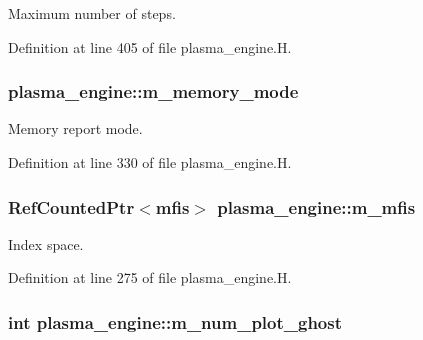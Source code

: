 Maximum number of steps. 



Definition at line 405 of file plasma\+\_\+engine.\+H.

\subsubsection[{\texorpdfstring{m\+\_\+memory\+\_\+mode}{m_memory_mode}}]{ plasma\+\_\+engine\+::m\+\_\+memory\+\_\+mode\hspace{0.3cm}{\ttfamily [protected]}}\hypertarget{classplasma__engine_aa19df07c387c3eb81c8ed8c00735389c}{}\label{classplasma__engine_aa19df07c387c3eb81c8ed8c00735389c}


Memory report mode. 



Definition at line 330 of file plasma\+\_\+engine.\+H.

\subsubsection[{\texorpdfstring{m\+\_\+mfis}{m_mfis}}]{\setlength{\rightskip}{0pt plus 5cm}Ref\+Counted\+Ptr$<${\bf mfis}$>$ plasma\+\_\+engine\+::m\+\_\+mfis\hspace{0.3cm}{\ttfamily [protected]}}\hypertarget{classplasma__engine_a585df123a78ab10b23c68209f2d36e7d}{}\label{classplasma__engine_a585df123a78ab10b23c68209f2d36e7d}


Index space. 



Definition at line 275 of file plasma\+\_\+engine.\+H.

\subsubsection[{\texorpdfstring{m\+\_\+num\+\_\+plot\+\_\+ghost}{m_num_plot_ghost}}]{\setlength{\rightskip}{0pt plus 5cm}int plasma\+\_\+engine\+::m\+\_\+num\+\_\+plot\+\_\+ghost\hspace{0.3cm}{\ttfamily [protected]}}\hypertarget{classplasma__engine_a2afdfef0059dc396540d1da383358474}{}\label{classplasma__engine_a2afdfef0059dc396540d1da383358474}


